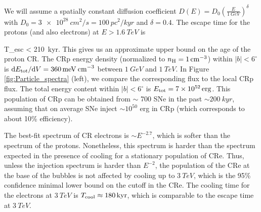 We will assume a spatially constant diffusion coefficient $D(E) = D_0\left(\frac{E}{\SI{1}{GeV}}\right)^\delta$ with $D_0 = \SI{3e28}{cm^2/s} = \SI{100}{pc^2/kyr}$ and $\delta = 0.4$.
The escape time for the protons (and also electrons) at $E > \SI{1.6}{TeV}$ is 

\be
T_{\rm esc} <  \approx \SI{210}{kyr}.
\ee
This gives us an approximate upper bound on the age of the proton CR.
The CRp energy density (normalized to $n_{\text{H}} = \SI{1}{cm^{-3}}$) within $|b| < 6^\circ$ is 
$\text{d} E_{\text{tot}} / \text{d} V = \SI{360}{meV\: cm^{-3}}$ between $\SI{1}{GeV}$ and $\SI{1}{TeV}$.
In Figure \ref{fig:Particle_spectra} (left), we compare the corresponding flux to the local CRp flux.
The total energy content within $|b| < 6^\circ$ is $E_{\text{tot}} = \SI{7e52}{erg}$.
This population of CRp can be obtained from $\sim$ 700 SNe in the past $\sim \SI{200}{kyr}$, 
assuming that on average SNe inject $\sim 10^{50}$ erg in CRp (which corresponds to about 10\% efficiency).

The best-fit spectrum of CR electrons is $\sim E^{-2.7}$, which is softer than the spectrum of the protons.
Nonetheless, this spectrum is harder than the spectrum expected in the presence of cooling
for a stationary population of CRe.
Thus, unless the injection spectrum is harder than $E^{-2}$, the population of the CRe at the base of the 
bubbles is not affected by cooling up to $\SI{3}{TeV}$,
which is the 95\% confidence minimal lower bound on the cutoff in the CRe. 
The cooling time for the electrons at %
$\SI{3}{TeV}$ is $T_{\rm cool} \approx \SI{180}{kyr}$,
which is comparable to the escape time at $\SI{3}{TeV}$.

